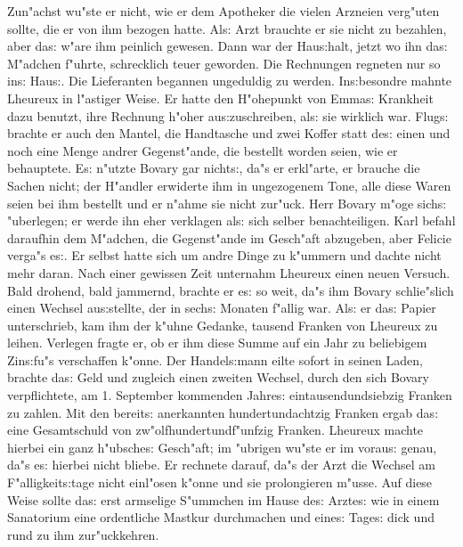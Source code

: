 \documentclass[oneside,12pt]{book}
\newcommand{\s}{s:}%
\begin{document}
\newpage\begin{center}
{\large \so{Vierzehnte{\s} Kapitel}}\bigskip\bigskip
\end{center}

Zun"achst wu"ste er nicht, wie er dem Apotheker die vielen
Arzneien ver\-g"uten sollte, die er von ihm bezogen hatte. Al{\s}
Arzt brauchte er sie nicht zu bezahlen, aber da{\s} w"are ihm
peinlich gewesen. Dann war der Hau{\s}halt, jetzt wo ihn da{\s}
M"adchen f"uhrte, schrecklich teuer geworden. Die Rechnungen
regneten nur so in{\s} Hau{\s}. Die Lieferanten begannen
ungeduldig zu werden. In{\s}besondre mahnte Lheureux in l"astiger
Weise. Er hatte den H"ohepunkt von Emma{\s} Krankheit dazu
benutzt, ihre Rechnung h"oher au{\s}zuschreiben, al{\s} sie
wirklich war. Flug{\s} brachte er auch den Mantel, die Handtasche
und zwei Koffer statt de{\s} einen und noch eine Menge andrer
Gegenst"ande, die bestellt worden seien, wie er behauptete. E{\s}
n"utzte Bovary gar nicht{\s}, da"s er erkl"arte, er brauche die
Sachen nicht; der H"andler erwiderte ihm in ungezogenem Tone, alle
diese Waren seien bei ihm bestellt und er n"ahme sie nicht
zur"uck. Herr Bovary m"oge sich{\s} "uberlegen; er werde ihn eher
verklagen al{\s} sich selber benachteiligen. Karl befahl daraufhin
dem M"adchen, die Gegenst"ande im Gesch"aft abzugeben, aber
Felicie verga"s e{\s}. Er selbst hatte sich um andre Dinge zu
k"ummern und dachte nicht mehr daran. Nach einer gewissen Zeit
unternahm Lheureux einen neuen Versuch. Bald drohend, bald
jammernd, brachte er e{\s} so weit, da"s ihm Bovary schlie"slich
einen Wechsel au{\s}stellte, der in sech{\s} Monaten f"allig war.
Al{\s} er da{\s} Papier unterschrieb, kam ihm der k"uhne Gedanke,
tausend Franken von Lheureux zu leihen. Verlegen fragte er, ob er
ihm diese Summe auf ein Jahr zu beliebigem Zin{\s}fu"s verschaffen
k"onne. Der Handel{\s}mann eilte sofort in seinen Laden, brachte
da{\s} Geld und zugleich einen zweiten Wechsel, durch den sich
Bovary verpflichtete, am 1. September kommenden Jahre{\s}
eintausendundsiebzig Franken zu zahlen. Mit den bereit{\s}
anerkannten hundertundachtzig Franken ergab da{\s} eine
Gesamtschuld von zw"olfhundertundf"unfzig Franken. Lheureux machte
hierbei ein ganz h"ubsche{\s} Gesch"aft; im "ubrigen wu"ste er im
vorau{\s} genau, da"s e{\s} hierbei nicht bliebe. Er rechnete
darauf, da"s der Arzt die Wechsel am F"alligkeit{\s}tage nicht
einl"osen k"onne und sie prolongieren m"usse. Auf diese Weise
sollte da{\s} erst armselige S"ummchen im Hause de{\s} Arzte{\s}
wie in einem Sanatorium eine ordentliche Mastkur durchmachen und
eine{\s} Tage{\s} dick und rund zu ihm zur"uckkehren.
\end{document}
